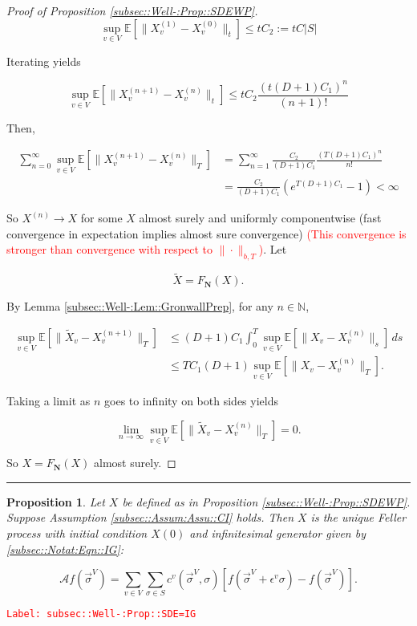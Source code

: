 \documentclass[12pt]{article}
\newcommand{\mb}{\mathbb}
\newcommand{\mc}{\mathcal}
\newcommand{\ra}{\rightarrow}
\newcommand{\ep}{\epsilon}
\newcommand{\tr}{\textcolor{red}}
\newcommand{\labe}[1]{\tr{\texttt{Label: #1}}}
\newcommand{\lin}{\rule{\linewidth}{0.4 pt}}
\newcommand{\ex}[1]{\mb{E}\left[#1\right]}			%
\newcommand{\defeq}{:=}								%
\renewcommand{\v}{v}							%
\renewcommand{\S}{S}							%
\newcommand{\s}{\sigma}							%
\newcommand{\sv}{\vec{\s}}						%
\renewcommand{\b}{b}							%
\newcommand{\ev}{\ep}							%
\newcommand{\T}{T}								%
\renewcommand{\t}{t}							%
\renewcommand{\tt}{s}							%
\newcommand{\X}{X}								%
\newcommand{\IG}{\mc{A}}						%
\newcommand{\IGr}{c}							%
\newcommand{\vind}[1]{^{#1}}					%
\newcommand{\vsi}[1]{^{#1}}						%
\newcommand{\cind}[1]{_{#1}}					%
\newcommand{\tp}[1]{(#1)}						%
\newcommand{\const}{C}							%
\newcommand{\degr}{D}							%
\newcommand{\sln}[1]{^{(#1)}}					%
\newcommand{\poisses}{\mathbf{N}}				%
\newcommand{\Fpo}{F_{\poisses}}					%
\newcommand{\alt}[1]{\widetilde{#1}}			%
\newcommand{\indx}[1]{_{#1}}					%
\newtheorem{prop}[thms]{Proposition}
\begin{document}
\begin{proof}[Proof of Proposition \ref{subsec::Well-:Prop::SDEWP}]
\[\sup_{\v \in V}\ex{\|\X\sln{1}\cind{\v} - \X\sln{0}\cind{\v}\|_\t} \leq \t\const\indx{2} \defeq \t\const|\S|\]

Iterating yields

\[\sup_{\v \in V} \ex{\|\X\sln{n+1}\cind{\v} - \X\sln{n}\cind{\v}\|_\t} \leq \t\const\indx{2}\frac{(\t(\degr+1)\const\indx{1})^n}{(n+1)!}\]

Then,

\begin{align*}
\sum_{n=0}^\infty \sup_{\v \in V} \ex{\|\X\sln{n+1}\cind{\v} - \X\sln{n}\cind{\v}\|_\T} &= \sum_{n=1}^\infty \frac{\const\indx{2}}{(\degr+1)\const\indx{1}}\frac{(\T(\degr+1)\const\indx{1})^{n}}{n !}\\
& = \frac{\const\indx{2}}{(\degr+1)\const\indx{1}}(e^{\T(\degr+1)\const\indx{1}} - 1) < \infty
\end{align*}


So \(\X\sln{n} \ra \X\) for some \(\X\) almost surely and uniformly componentwise (fast convergence in expectation implies almost sure convergence) \tr{(This convergence is stronger than convergence with respect to \(\|\cdot\|_{\b,\T}\))}. Let 

\[\alt{\X} = \Fpo(\X).\]

By Lemma \ref{subsec::Well-:Lem::GronwallPrep}, for any \(n\in\mb{N}\),

\begin{align*}
\sup_{\v \in V} \ex{\|\alt{\X}\cind{\v} - \X\sln{n+1}\cind{\v}\|_\T} &\leq (\degr+1)\const\indx{1}\int_0^\T \sup_{\v \in V}\ex{\|\X\cind{\v} - \X\sln{n}\cind{\v}\|_\tt}\,d\tt \\
&\leq \T\const\indx{1}(\degr+1)\sup_{\v\in V} \ex{\|\X\cind{\v} - \X\sln{n}\cind{\v}\|_\T}.
\end{align*}

Taking a limit as \(n\) goes to infinity on both sides yields

\[\lim_{n\ra\infty} \sup_{\v \in V} \ex{\|\alt{\X}\cind{\v} - \X\sln{n}\cind{\v}\|_\T} = 0.\]

So \(\X= \Fpo(\X)\) almost surely.
\end{proof}

\lin

\begin{prop}
Let \(\X\) be defined as in Proposition \ref{subsec::Well-:Prop::SDEWP}. Suppose Assumption \ref{subsec::Assum:Assu::CI} holds. Then \(\X\) is the unique Feller process with initial condition \(\X\tp{0}\) and infinitesimal generator given by \eqref{subsec::Notat:Eqn::IG}:

\[\IG f(\sv\vsi{V}) = \sum_{\v\in V}\sum_{\s \in \S} \IGr\vind{\v}(\sv\vsi{V},\s)[f(\sv\vsi{V} + \ev\vind{\v}\s) - f(\sv\vsi{V})].\]
\label{subsec::Well-:Prop::SDE=IG}
\end{prop}
\labe{subsec::Well-:Prop::SDE=IG}
\end{document}
